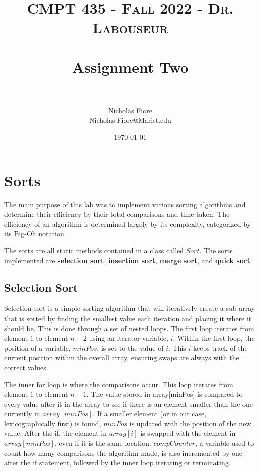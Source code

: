 \documentclass[letterpaper, 10pt,DIV=13]{scrartcl}
\title{	
   \normalfont \normalsize 
   \textsc{CMPT 435 - Fall 2022 - Dr. Labouseur} \\[10pt] %
   \horrule{0.5pt} \\[0.25cm] 	%
   \huge Assignment Two  \\     	    %
   \horrule{0.5pt} \\[0.25cm] 	%
}
\author{Nicholas Fiore \\ \normalsize Nicholas.Fiore@Marist.edu}
\date{\normalsize\today} 	%
\numberwithin{equation}{section} %
\numberwithin{figure}{section} %
\numberwithin{table}{section} %
\begin{document}
\maketitle %

\section{Sorts}
The main purpose of this lab was to implement various sorting algorithms and determine their efficiency by their total comparisons and time taken. The efficiency of an algorithm is determined largely by its complexity, categorized by its Big-Oh notation.

The sorts are all static methods contained in a class called $Sort$. The sorts implemented are \textbf{selection sort}, \textbf{insertion sort}, \textbf{merge sort}, and \textbf{quick sort}.

\subsection{Selection Sort}
Selection sort is a simple sorting algorithm that will iteratively create a sub-array that is sorted by finding the smallest value each iteration and placing it where it should be. This is done through a set of nested loops. The first loop iterates from element $1$ to element $n-2$ using an iterator variable, $i$. Within the first loop, the position of a variable, $minPos$, is set to the value of $i$. This $i$ keeps track of the current position within the overall array, ensuring swaps are always with the correct values.

The inner for loop is where the comparisons occur. This loop iterates from element $1$ to element $n-1$. The value stored in array[minPos] is compared to every value after it in the array to see if there is an element smaller than the one currently in $array[minPos]$. If a smaller element (or in our case, lexicographically first) is found, $minPos$ is updated with the position of the new value. After the if, the element in $array[i]$ is swapped with the element in $array[minPos]$, even if it is the same location. $compCounter$, a variable used to count how many comparisons the algorithm made, is also incremented by one after the if statement, followed by the inner loop iterating or terminating.
\end{document}
